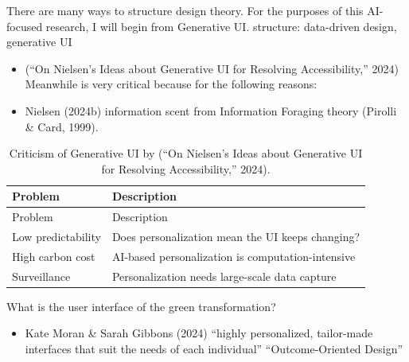 \documentclass[
  letterpaper,
  DIV=11,
  numbers=noendperiod]{scrartcl}
\providecommand{\tightlist}{%
  \setlength{\itemsep}{0pt}\setlength{\parskip}{0pt}}\usepackage{longtable,booktabs,array}
\begin{document}
There are many ways to structure design theory. For the purposes of this
AI-focused research, I will begin from Generative UI. structure:
data-driven design, generative UI

\begin{itemize}
\item
  ({``On {Nielsen}'s Ideas about Generative {UI} for Resolving
  Accessibility,''} 2024) Meanwhile is very critical because for the
  following reasons:
\item
  Nielsen (2024b) information scent from Information Foraging theory
  (Pirolli \& Card, 1999).
\end{itemize}

\begin{longtable}[]{@{}
  >{\raggedright\arraybackslash}p{}
  >{\raggedright\arraybackslash}p{}@{}}
\caption{Criticism of Generative UI by ({``On {Nielsen}'s Ideas about
Generative {UI} for Resolving Accessibility,''} 2024).}\tabularnewline
\toprule\noalign{}
\begin{minipage}[b]{\linewidth}\raggedright
Problem
\end{minipage} & \begin{minipage}[b]{\linewidth}\raggedright
Description
\end{minipage} \\
\midrule\noalign{}
\endfirsthead
\toprule\noalign{}
\begin{minipage}[b]{\linewidth}\raggedright
Problem
\end{minipage} & \begin{minipage}[b]{\linewidth}\raggedright
Description
\end{minipage} \\
\midrule\noalign{}
\endhead
\bottomrule\noalign{}
\endlastfoot
Low predictability & Does personalization mean the UI keeps changing? \\
High carbon cost & AI-based personalization is computation-intensive \\
Surveillance & Personalization needs large-scale data capture \\
\end{longtable}

What is the user interface of the green transformation?

\begin{itemize}
\tightlist
\item
  Kate Moran \& Sarah Gibbons (2024) ``highly personalized, tailor-made
  interfaces that suit the needs of each individual'' ``Outcome-Oriented
  Design''
\end{itemize}
\end{document}
